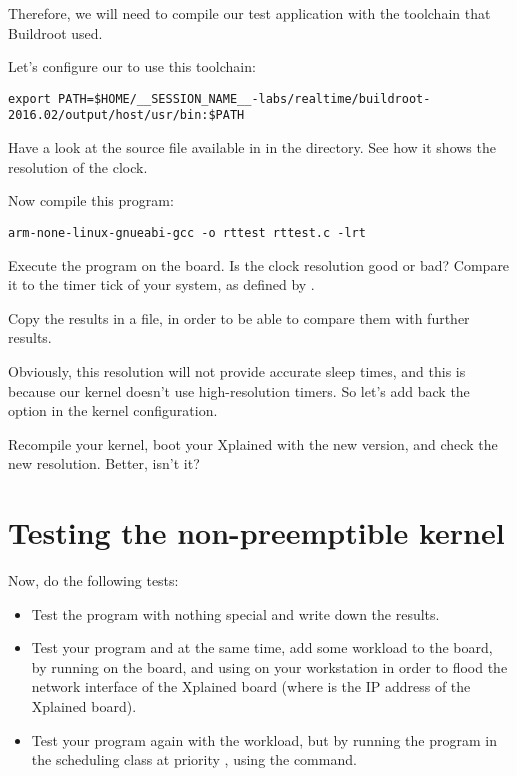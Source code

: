 Therefore, we will need to compile our test application with the
toolchain that Buildroot used.

Let's configure our  to use this toolchain:

\small
\begin{verbatim}
export PATH=$HOME/__SESSION_NAME__-labs/realtime/buildroot-2016.02/output/host/usr/bin:$PATH
\end{verbatim}
\normalsize

Have a look at the  source file available in
 in the  directory. See how it shows the
resolution of the  clock.

Now compile this program:
\begin{verbatim}
arm-none-linux-gnueabi-gcc -o rttest rttest.c -lrt
\end{verbatim}

Execute the program on the board. Is the clock resolution good or bad?
Compare it to the timer tick of your system, as defined by
.

Copy the results in a file, in order to be able to compare them
with further results.

Obviously, this resolution will not provide accurate sleep times, and
this is because our kernel doesn't use high-resolution timers. So
let's add back the  option in the kernel
configuration.

Recompile your kernel, boot your Xplained with the new version, and
check the new resolution. Better, isn't it?

\section{Testing the non-preemptible kernel}

Now, do the following tests:
\begin{itemize}
\item Test the program with nothing special and write down the
  results.
\item Test your program and at the same time, add some workload to the
  board, by running  on the
  board, and using  on your
  workstation in order to flood the network interface of the Xplained
  board (where  is the IP address of the Xplained
  board).
\item Test your program again with the workload, but by running the
  program in the  scheduling class at priority
  , using the  command.
\end{itemize}

